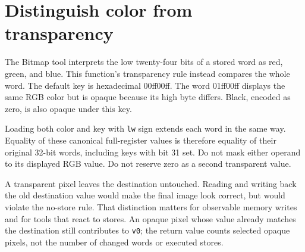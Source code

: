 \section{Distinguish color from transparency}\label{blit-color}
The Bitmap tool interprets the low twenty-four bits of a stored word as red, green, and blue. This function's transparency rule instead compares the whole word. The default key is hexadecimal 00ff00ff. The word 01ff00ff displays the same RGB color but is opaque because its high byte differs. Black, encoded as zero, is also opaque under this key.

Loading both color and key with \texttt{lw} sign extends each word in the same way. Equality of these canonical full-register values is therefore equality of their original 32-bit words, including keys with bit 31 set. Do not mask either operand to its displayed RGB value. Do not reserve zero as a second transparent value.

A transparent pixel leaves the destination untouched. Reading and writing back the old destination value would make the final image look correct, but would violate the no-store rule. That distinction matters for observable memory writes and for tools that react to stores. An opaque pixel whose value already matches the destination still contributes to \texttt{v0}; the return value counts selected opaque pixels, not the number of changed words or executed stores.
